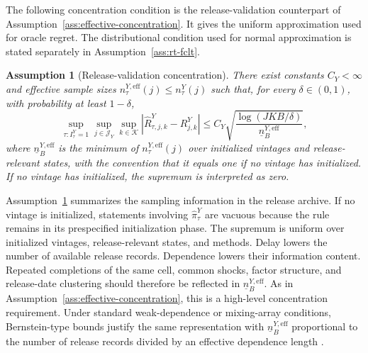 \documentclass[a4paper, 12pt]{article}
\theoremstyle{plain}
\newtheorem{assumption}{Assumption}
\theoremstyle{remark}
\newcommand{\Kcal}{\mathcal{K}}
\newcommand{\1}{\mathbf{1}}
\begin{document}
The following concentration condition is the release-validation counterpart of Assumption~\ref{ass:effective-concentration}. It gives the uniform approximation used for oracle regret. The distributional condition used for normal approximation is stated separately in Assumption~\ref{ass:rt-fclt}.

\begin{assumption}[Release-validation concentration]
\label{ass:rt-concentration}
There exist constants \(C_Y<\infty\) and effective sample sizes \(n^{Y,\mathrm{eff}}_\tau(j)\leq n^Y_\tau(j)\) such that, for every \(\delta\in(0,1)\), with probability at least \(1-\delta\),
\begin{equation}
\label{eq:rt-concentration}
    \sup_{\tau:I^Y_\tau=1}
    \sup_{j\in\mathcal J_Y}
    \sup_{k\in\Kcal}
    \left|\widehat R^Y_{\tau,j,k}-R^Y_{j,k}\right|
    \leq
    C_Y
    \sqrt{\frac{\log(JKB/\delta)}{\underline n^{Y,\mathrm{eff}}_B}},
\end{equation}
where \(\underline n^{Y,\mathrm{eff}}_B\) is the minimum of \(n^{Y,\mathrm{eff}}_\tau(j)\) over initialized vintages and release-relevant states, with the convention that it equals one if no vintage has initialized. If no vintage has initialized, the supremum is interpreted as zero.
\end{assumption}

Assumption~\ref{ass:rt-concentration} summarizes the sampling information in the release archive. If no vintage is initialized, statements involving \(\widehat\pi^Y_\tau\) are vacuous because the rule remains in its prespecified initialization phase. The supremum is uniform over initialized vintages, release-relevant states, and methods. Delay lowers the number of available release records. Dependence lowers their information content. Repeated completions of the same cell, common shocks, factor structure, and release-date clustering should therefore be reflected in \(\underline n^{Y,\mathrm{eff}}_B\). As in Assumption~\ref{ass:effective-concentration}, this is a high-level concentration requirement. Under standard weak-dependence or mixing-array conditions, Bernstein-type bounds justify the same representation with \(\underline n^{Y,\mathrm{eff}}_B\) proportional to the number of release records divided by an effective dependence length \citep{MerlevedePeligradRio2011}.
\end{document}
